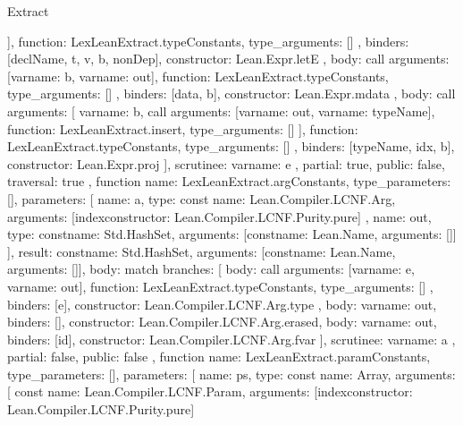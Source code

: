 \begin{lexlean}{Extract}
\begin{toolingmodule}
{{{{{{                }
              ],
              function: LexLeanExtract.typeConstants,
              type_arguments: []
            },
            binders: [declName, t, v, b, nonDep],
            constructor: Lean.Expr.letE
          },
          {
            body: call{
              arguments: [var{name: b}, var{name: out}],
              function: LexLeanExtract.typeConstants,
              type_arguments: []
            },
            binders: [data, b],
            constructor: Lean.Expr.mdata
          },
          {
            body: call{
              arguments: [
                var{name: b},
                call{
                  arguments: [var{name: out}, var{name: typeName}],
                  function: LexLeanExtract.insert,
                  type_arguments: []
                }
              ],
              function: LexLeanExtract.typeConstants,
              type_arguments: []
            },
            binders: [typeName, idx, b],
            constructor: Lean.Expr.proj
          }
        ],
        scrutinee: var{name: e}
      },
      partial: true,
      public: false,
      traversal: true
    },
    function{
      name: LexLeanExtract.argConstants,
      type_parameters: [],
      parameters: [
        {
          name: a,
          type: const{
            name: Lean.Compiler.LCNF.Arg,
            arguments: [index{constructor: Lean.Compiler.LCNF.Purity.pure}]
          }
        },
        {
          name: out,
          type: const{name: Std.HashSet, arguments: [const{name: Lean.Name, arguments: []}]}
        }
      ],
      result: const{name: Std.HashSet, arguments: [const{name: Lean.Name, arguments: []}]},
      body: match{
        branches: [
          {
            body: call{
              arguments: [var{name: e}, var{name: out}],
              function: LexLeanExtract.typeConstants,
              type_arguments: []
            },
            binders: [e],
            constructor: Lean.Compiler.LCNF.Arg.type
          },
          {body: var{name: out}, binders: [], constructor: Lean.Compiler.LCNF.Arg.erased},
          {body: var{name: out}, binders: [id], constructor: Lean.Compiler.LCNF.Arg.fvar}
        ],
        scrutinee: var{name: a}
      },
      partial: false,
      public: false
    },
    function{
      name: LexLeanExtract.paramConstants,
      type_parameters: [],
      parameters: [
        {
          name: ps,
          type: const{
            name: Array,
            arguments: [
              const{
                name: Lean.Compiler.LCNF.Param,
                arguments: [index{constructor: Lean.Compiler.LCNF.Purity.pure}]
}}}}}
\end{toolingmodule}
\end{lexlean}
